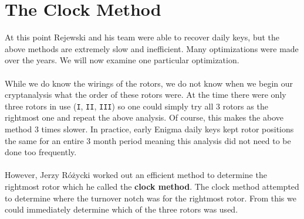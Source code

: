 \section{The Clock Method}

At this point Rejewski and his team were able to recover daily keys, but the above methods are extremely slow and inefficient. Many optimizations were made over the years. We will now examine one particular optimization.
\\\\While we do know the wirings of the rotors, we do not know when we begin our cryptanalysis what the order of these rotors were. At the time there were only three rotors in use (\texttt{I}, \texttt{II}, \texttt{III}) so one could simply try all 3 rotors as the rightmost one and repeat the above analysis. Of course, this makes the above method 3 times slower. In practice, early Enigma daily keys kept rotor positions the same for an entire 3 month period meaning this analysis did not need to be done too frequently.
\\\\However, Jerzy Różycki worked out an efficient method to determine the rightmost rotor which he called the {\bf{clock method}}. The clock method attempted to determine where the turnover notch was for the rightmost rotor. From this we could immediately determine which of the three rotors was used.

